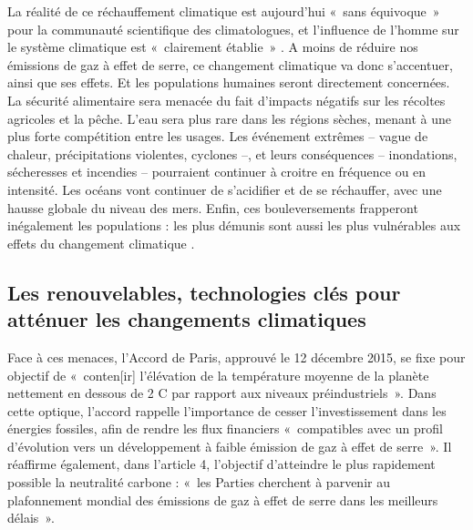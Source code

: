 La réalité de ce réchauffement climatique est aujourd’hui «~sans équivoque~» pour la communauté scientifique des climatologues, et l'influence de l'homme sur le système climatique est «~clairement établie~» \citep{IPCC2014}.
A moins de réduire nos émissions de gaz à effet de serre, ce changement climatique va donc s’accentuer, ainsi que ses effets. Et les populations humaines seront directement concernées. La sécurité alimentaire sera menacée du fait d’impacts négatifs sur les récoltes agricoles et la pêche. L’eau sera plus rare dans les régions sèches, menant à une plus forte compétition entre les usages. Les événement extrêmes -- vague de chaleur, précipitations violentes, cyclones --, et leurs conséquences -- inondations, sécheresses et incendies -- pourraient continuer à croitre en fréquence ou en intensité. Les océans vont continuer de s’acidifier et de se réchauffer, avec une hausse globale du niveau des mers. 
Enfin, ces bouleversements frapperont inégalement les populations : les plus démunis sont aussi les plus vulnérables aux effets du changement climatique \citep{IPCC2014}.


\subsection{Les renouvelables, technologies clés pour atténuer les changements climatiques}
Face à ces menaces, l’Accord de Paris, approuvé le 12 décembre 2015, se fixe pour objectif de «~conten[ir] l’élévation de la température moyenne de la planète nettement en dessous de 2 \degree C par rapport aux niveaux préindustriels~». 
Dans cette optique, l’accord rappelle l’importance de cesser l’investissement dans les énergies fossiles, afin de rendre les flux financiers «~compatibles avec un profil d’évolution vers un développement  à faible émission de gaz  à effet de serre~».  Il réaffirme également, dans l’article 4, l’objectif d’atteindre le plus rapidement possible la neutralité carbone : «~les Parties cherchent  à parvenir au plafonnement mondial des émissions de gaz  à effet de serre dans les meilleurs délais ».

